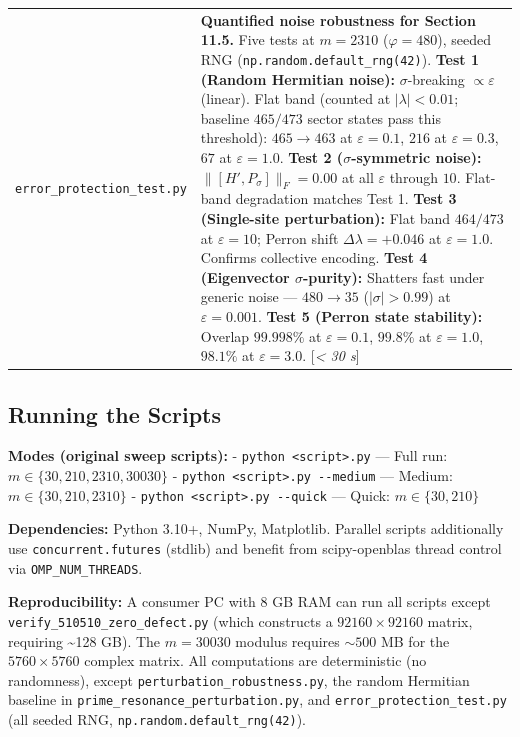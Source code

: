 \documentclass[11pt,letterpaper]{article}
\theoremstyle{definition}
\theoremstyle{remark}
\begin{document}
\begin{longtable}[]{@{}
  >{\raggedright\arraybackslash}p{}
  >{\raggedright\arraybackslash}p{}@{}}
\texttt{error\_protection\_test.py} & \textbf{Quantified noise robustness for Section 11.5.} Five tests at $m = 2310$ ($\varphi = 480$), seeded RNG (\texttt{np.random.default\_rng(42)}). \textbf{Test 1 (Random Hermitian noise):} $\sigma$-breaking $\propto \varepsilon$ (linear). Flat band (counted at $|\lambda| < 0.01$; baseline $465/473$ sector states pass this threshold): $465 \to 463$ at $\varepsilon = 0.1$, $216$ at $\varepsilon = 0.3$, $67$ at $\varepsilon = 1.0$. \textbf{Test 2 ($\sigma$-symmetric noise):} $\|[H', P_\sigma]\|_F = 0.00$ at all $\varepsilon$ through $10$. Flat-band degradation matches Test 1. \textbf{Test 3 (Single-site perturbation):} Flat band $464/473$ at $\varepsilon = 10$; Perron shift $\Delta\lambda = +0.046$ at $\varepsilon = 1.0$. Confirms collective encoding. \textbf{Test 4 (Eigenvector $\sigma$-purity):} Shatters fast under generic noise --- $480 \to 35$ ($|\sigma| > 0.99$) at $\varepsilon = 0.001$. \textbf{Test 5 (Perron state stability):} Overlap $99.998\%$ at $\varepsilon = 0.1$, $99.8\%$ at $\varepsilon = 1.0$, $98.1\%$ at $\varepsilon = 3.0$. [\textit{\textless{} 30 s}] \\
\end{longtable}

\subsection{Running the Scripts}\label{running-the-scripts}

\textbf{Modes (original sweep scripts):} - \texttt{python\ \textless{}script\textgreater{}.py} --- Full run: $m \in \{30, 210, 2310, 30030\}$ - \texttt{python\ \textless{}script\textgreater{}.py\ -\/-medium} --- Medium: $m \in \{30, 210, 2310\}$ - \texttt{python\ \textless{}script\textgreater{}.py\ -\/-quick} --- Quick: $m \in \{30, 210\}$

\textbf{Dependencies:} Python 3.10+, NumPy, Matplotlib. Parallel scripts additionally use \texttt{concurrent.\hspace{0pt}futures} (stdlib) and benefit from scipy-openblas thread control via \texttt{OMP\_NUM\_THREADS}.

\textbf{Reproducibility:} A consumer PC with 8 GB RAM can run all scripts except \texttt{verify\_510510\_\hspace{0pt}zero\_defect.py} (which constructs a $92160 \times 92160$ matrix, requiring \textasciitilde128 GB). The $m = 30030$ modulus requires $\sim 500$ MB for the $5760 \times 5760$ complex matrix. All computations are deterministic (no randomness), except \texttt{perturbation\_robustness.py}, the random Hermitian baseline in \texttt{prime\_resonance\_\hspace{0pt}perturbation.py}, and \texttt{error\_\hspace{0pt}protection\_test.py} (all seeded RNG, \texttt{np.random.default\_rng(42)}).
\end{document}
